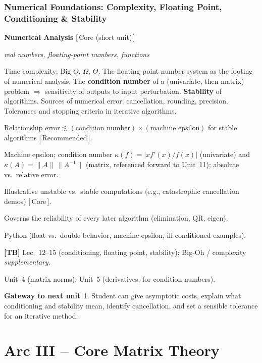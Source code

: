 \documentclass[11pt]{article}
\newcommand{\dom}[1]{{\sffamily\bfseries\color{RoyalBlue}#1}}
\newcommand{\pri}[1]{{\footnotesize\sffamily\color{BrickRed}[\,#1\,]}}
\newcommand{\obj}[1]{{\itshape #1}}
\newenvironment{unitfields}
  {\begin{description}[leftmargin=0pt,labelindent=0pt,style=nextline,
      font=\normalfont\sffamily\bfseries\color{RoyalBlue},itemsep=3pt,topsep=4pt]}
  {\end{description}}
\newcommand{\ff}[1]{\item[#1]}
\theoremstyle{definition}
\newtheorem*{gateway}{Gateway to next unit}
\begin{document}
\section{Numerical Foundations: Complexity, Floating Point, Conditioning \& Stability}
\begin{unitfields}
\ff{Domain(s)} \dom{Numerical Analysis} \pri{Core (short unit)}
\ff{Primary object(s)} \obj{real numbers, floating-point numbers, functions}
\ff{Topics}
  Time complexity: Big-$O$, $\Omega$, $\Theta$. The floating-point number
  system as the footing of numerical analysis. The \textbf{condition number} of
  a (univariate, then matrix) problem $\Rightarrow$ sensitivity of outputs to
  input perturbation. \textbf{Stability} of algorithms. Sources of numerical
  error: cancellation, rounding, precision. Tolerances and stopping criteria
  in iterative algorithms.
\ff{Key theorems}
  Relationship $\text{error}\lesssim(\text{condition number})\times
  (\text{machine epsilon})$ for stable algorithms \pri{Recommended}.
\ff{Tools / formulas}
  Machine epsilon; condition number $\kappa(f)=|xf'(x)/f(x)|$ (univariate) and
  $\kappa(A)=\|A\|\,\|A^{-1}\|$ (matrix, referenced forward to Unit~11);
  absolute vs.\ relative error.
\ff{Algorithms}
  Illustrative unstable vs.\ stable computations (e.g., catastrophic
  cancellation demos) \pri{Core}.
\ff{Applications}
  Governs the reliability of every later algorithm (elimination, QR, eigen).
\ff{Languages}
  Python (float vs.\ double behavior, machine epsilon,
  ill-conditioned examples).
\ff{Textbook refs}
  \textbf{[TB]} Lec.~12--15 (conditioning, floating point, stability);
  Big-Oh / complexity \emph{supplementary}.
\ff{ENTER} Unit~4 (matrix norms); Unit~5 (derivatives, for condition numbers).
\end{unitfields}
\begin{gateway}
Student can give asymptotic costs, explain what conditioning and stability mean,
identify cancellation, and set a sensible tolerance for an iterative method.
\end{gateway}

\part*{Arc III -- Core Matrix Theory}

\end{document}
